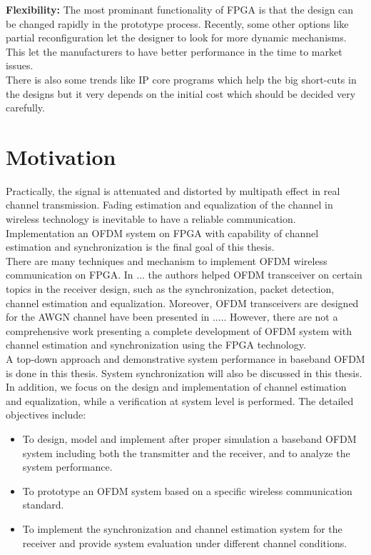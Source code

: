 \textbf{Flexibility:} The most prominant functionality of FPGA is that the design can be changed rapidly in the prototype process. Recently, some other options like partial reconfiguration let the designer to look for more dynamic mechanisms. This let the manufacturers to have better performance in the time to market issues.\\
There is also some trends like IP core programs which help the big short-cuts in the designs but it very depends on the initial cost which should be decided very carefully.


\section{Motivation}

Practically, the signal is attenuated and distorted by multipath effect in real channel transmission. Fading estimation and equalization of the channel in wireless technology is inevitable to have a reliable communication. Implementation an OFDM system on FPGA with capability of channel estimation and synchronization is the final goal of this thesis.\\
There are many techniques and mechanism to implement OFDM wireless communication on FPGA. In ... the authors helped OFDM transceiver on certain topics in the receiver design, such as the synchronization, packet detection, channel estimation and equalization. Moreover, OFDM transceivers are designed for the AWGN channel have been presented in ..... However, there are not a comprehensive work presenting a complete development of OFDM system with channel estimation and synchronization using the FPGA technology.\\

A top-down approach and demonstrative system performance in baseband OFDM is done in this thesis. System synchronization will also be discussed in this thesis. In addition, we focus on the design and implementation of channel estimation and equalization, while a verification at system level is performed. The detailed objectives include:\\
\begin{itemize}
\item To design, model and implement after proper simulation a baseband OFDM system including both the transmitter and the receiver, and to analyze the system performance.
\item To prototype an OFDM system based on a specific wireless communication standard.
\item To implement the synchronization and channel estimation system for the receiver and provide system evaluation under different channel conditions.
\end{itemize}


